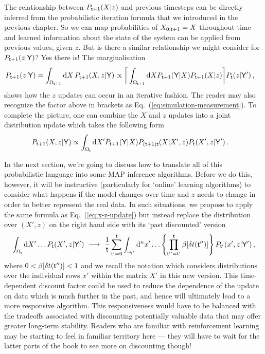 The relationship between $P_{{\sf t}+1}(X\vert z)$ and previous timesteps can be directly inferred from the probabilistic iteration formula that we introduced in the previous chapter. So we can map probabilities of $X_{0:{\sf t}+1} = X$ throughout time and learned information about the state of the system can be applied from previous values, given $z$. But is there a similar relationship we might consider for $P_{{\sf t}+1}(z\vert {\sf Y})$? Yes there is! The marginalisation
\begin{align} 
P_{{\sf t}+1}(z\vert {\sf Y}) = \int_{\Omega_{{\sf t}+1}} {\rm d}X \, P_{{\sf t}+1}(X,z\vert {\sf Y}) &\propto \bigg[ \int_{\Omega_{{\sf t}+1}} {\rm d}X P_{{\sf t}+1}({\sf Y}\vert X) P_{{\sf t}+1}(X\vert z) \bigg] P_{{\sf t}}(z\vert {\sf Y}') \label{eq:z-update}\,,
\end{align}
shows how the $z$ updates can occur in an iterative fashion. The reader may also recognize the factor above in brackets as Eq.~(\ref{eq:simulation-measurement}). To complete the picture, one can combine the $X$ and $z$ updates into a joint distribution update which takes the following form 
\begin{align} 
P_{{\sf t}+1}(X,z\vert {\sf Y}) &\propto \int_{\Omega_{{\sf t}}} {\rm d}X' P_{{\sf t}+1}({\sf Y}\vert X) P_{({\sf t}+1){\sf t}}(X\vert X', z) P_{{\sf t}}(X',z\vert {\sf Y}') \label{eq:x-z-update}\,.
\end{align}

In the next section, we're going to discuss how to translate all of this probabilistic language into some MAP inference algorithms. Before we do this, however, it will be instructive (particularly for `online' learning algorithms) to consider what happens if the model changes over time and $z$ needs to change in order to better represent the real data. In such situations, we propose to apply the same formula as Eq.~(\ref{eq:x-z-update}) but instead replace the distribution over $(X',z)$ on the right hand side with its `past discounted' version 
\begin{align}
\int_{\Omega_{{\sf t}}}{\rm d}X' \dots P_{{\sf t}}(X',z\vert {\sf Y}') \,\, \longrightarrow \,\, \frac{1}{{\sf t}}\sum_{{\sf t}'=0}^{{\sf t}}\int_{\omega_{{\sf t}'}}{\rm d}^nx' \dots \left\{ \prod_{{\sf t}''={\sf t}'}^{{\sf t}} \beta [\delta t({\sf t}'')] \right\} P_{{\sf t}'}(x',z\vert {\sf Y}') \,,
\end{align}
where $0 < \beta [\delta t({\sf t}'')] < 1$ and we recall the notation which considers distributions over the individual rows $x'$ within the matrix $X'$ in this new version. This time-dependent discount factor could be used to reduce the dependence of the update on data which is much further in the past, and hence will ultimately lead to a more responsive algorithm. This responsiveness would have to be balanced with the tradeoffs associated with discounting potentially valuable data that may offer greater long-term stability. Readers who are familiar with reinforcement learning may be starting to feel in familiar territory here --- they will have to wait for the latter parts of the book to see more on discounting though!

